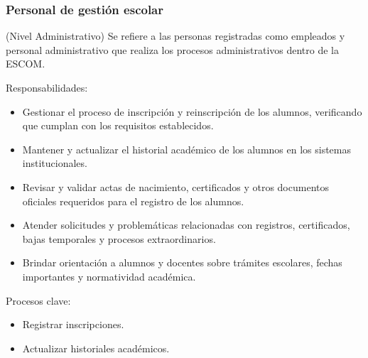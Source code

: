 \begin{Usuario}{\hypertarget{tPersonalGestion}{\subsubsection{Personal de gestión escolar}}}{(Nivel Administrativo)}{
        Se refiere a las personas registradas como empleados y personal administrativo que realiza los procesos administrativos dentro de la ESCOM.
    }
    \item[Responsabilidades:] \cdtEmpty
    \begin{itemize}
        \item Gestionar el proceso de inscripción y reinscripción de los alumnos, verificando que cumplan con los requisitos establecidos.
        \item Mantener y actualizar el historial académico de los alumnos en los sistemas institucionales.
        \item Revisar y validar actas de nacimiento, certificados y otros documentos oficiales requeridos para el registro de los alumnos.
        \item Atender solicitudes y problemáticas relacionadas con registros, certificados, bajas temporales y procesos extraordinarios.
        \item Brindar orientación a alumnos y docentes sobre trámites escolares, fechas importantes y normatividad académica.
    \end{itemize}
    \item[Procesos clave:] \cdtEmpty
    \begin{itemize}
         \item Registrar inscripciones.
         \item Actualizar historiales académicos.
    \end{itemize}
\end{Usuario}

